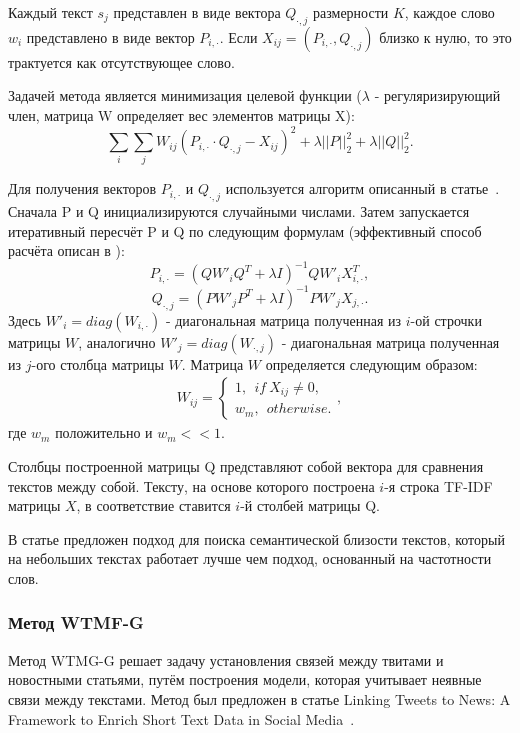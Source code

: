         Каждый текст $s_j$ представлен в виде вектора $Q_{\cdot,j}$ размерности $K$, каждое слово $w_i$ представлено в виде вектор $P_{i,\cdot}$.
        Если $X_{ij}=(P_{i,\cdot}, Q_{\cdot,j})$ близко к нулю, то это трактуется как отсутствующее слово.

        Задачей метода является минимизация целевой функции ($\lambda$ - регуляризирующий член, матрица W определяет вес элементов матрицы X):
        $$\sum_i \sum_j W_{ij} (P_{i,\cdot} \cdot Q_{\cdot,j} - X_{ij})^2 + \lambda ||P||^2_2 + \lambda ||Q||^2_2.$$

        Для получения векторов $P_{i,\cdot}$ и $Q_{\cdot,j}$ используется алгоритм описанный в статье~\cite{matrix_approximation}.
        Сначала P и Q инициализируются случайными числами. Затем запускается итеративный пересчёт P и Q по следующим формулам (эффективный способ расчёта описан в \cite{steck_recommender}):
        $$P_{i, \cdot} = (Q W'_i Q^T + \lambda I)^{-1} Q W'_i X_{i,\cdot}^T,$$
        $$Q_{\cdot, j} = (P W'_j P^T + \lambda I)^{-1} P W'_j X_{j,\cdot}.$$
        Здесь $W'_i = diag(W_{i, \cdot})$ - диагональная матрица полученная из $i$-ой строчки матрицы $W$,
        аналогично $W'_j = diag(W_{\cdot, j})$ - диагональная матрица полученная из $j$-ого столбца матрицы $W$.
        Матрица $W$ определяется следующим образом:
        \begin{gather}
            W_{ij} =
            \begin{cases}
                1, ~~if~X_{ij} \neq 0, \nonumber \\
                w_m, ~~otherwise.
            \end{cases},
        \end{gather}
        где $w_m$ положительно и $w_m << 1$.

        Столбцы построенной матрицы Q представляют собой вектора для сравнения текстов между собой.
        Тексту, на основе которого построена $i$-я строка TF-IDF матрицы $X$, в соответствие ставится $i$-й столбей матрицы Q.

        В статье предложен подход для поиска семантической близости текстов, который на небольших текстах работает лучше чем подход, основанный на частотности слов.

    \subsubsection{Метод WTMF-G}
        Метод WTMG-G решает задачу установления связей между твитами и новостными статьями, путём построения модели, которая учитывает неявные связи между текстами.
        Метод был предложен в статье Linking Tweets to News: A Framework to Enrich Short Text Data in Social Media~\cite{linking_base}.

